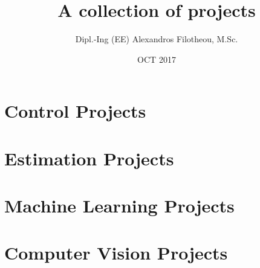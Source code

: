 \documentclass[11pt]{article}
\begin{document}
  \title{A collection of projects}
  \author{Dipl.-Ing (EE) Alexandros Filotheou, M.Sc.}
  \date{OCT 2017}
  \maketitle
  \vspace{5cm}

  \tableofcontents
  \thispagestyle{empty}
  \clearpage

  \section{Control Projects}
    
    
    

  \section{Estimation Projects}
    

  \section{Machine Learning Projects}
    

  \section{Computer Vision Projects}
    
\end{document}

